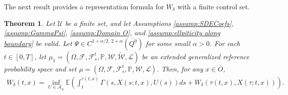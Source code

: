 \documentclass[amscd,amssymb,11pt]{article}
\newtheorem{theorem}{Theorem}
\numberwithin{theorem}{section}
\numberwithin{equation}{section}
\begin{document}
The next result provides a representation formula for $W_{\delta}$ with a finite control set.
\begin{theorem}\label{thm:DPWdeltaFin}
Let $\mathcal{U}$ be a finite set, and let Assumptions \ref{assump:SDECoefs}, \ref{assump:GammaPsi}, \ref{assump:Domain O}, and \ref{assump:ellpiticity along boundary} be valid. Let $\Psi\in C^{1+\alpha/2,\,2+\alpha}(\overline{Q^{0}})$ for some small $\alpha>0$. For each $t\in[0,T]$, let $\mu_{1}=(\Omega,\mathscr{F},\mathscr{F}_{s}^{t},\mathbb{P},\mathcal{W},\widetilde{\mathcal{W}},\mathcal{L})$ be an extended generalized reference probability space and set $\mu=(\Omega,\mathscr{F},\mathscr{F}_{s}^{t},\mathbb{P},\mathcal{W},\mathcal{L})$. Then, for any $x\in \overline O$,
\begin{align}\label{eq:DPWdeltaFin}
W_{\delta}(t,x)=\inf_{U\in\mathcal{A}_{\mu}}\mathbb{E}\left(\int_{t}^{\tau(t,x)}\Gamma\left(s,X(s;t,x),U(s)\right)ds+W_{\delta}(\tau(t,x),X(\tau;t,x))\right).
\end{align}
\end{theorem}
\end{document}
